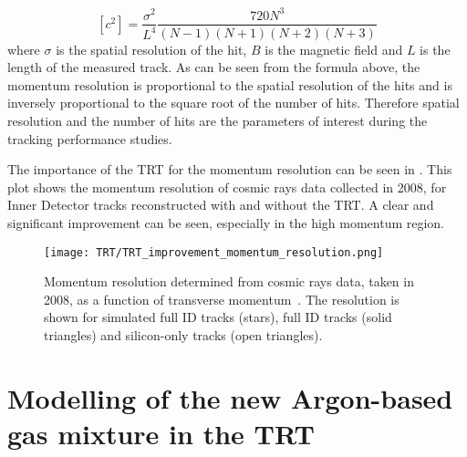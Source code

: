\begin{equation}
[c^2] = \dfrac{\sigma^2}{L^4}\dfrac{720 N^3}{(N-1)(N+1)(N+2)(N+3)}
\end{equation}
where $\sigma$ is the spatial resolution of the hit, $B$ is the magnetic field and $L$ is the length of the measured track.
As can be seen from the formula above, the momentum resolution is proportional to the spatial resolution of the hits and is inversely proportional to the square root of 
the number of hits. Therefore spatial resolution and the number of hits are the parameters of interest during the tracking performance studies.

The importance of the TRT for the momentum resolution can be seen in .
This plot shows the momentum resolution of cosmic rays data collected in 2008, for Inner Detector tracks reconstructed with and without the TRT.
A clear and significant improvement can be seen, especially in the high momentum region.


\begin{figure}[h]
\centering
\texttt{[image: TRT/TRT\_improvement\_momentum\_resolution.png]}
\caption{ 
Momentum resolution determined from cosmic rays data, taken in 2008, as a function of transverse momentum~\cite{Aad:2010bx}.
The resolution is shown for simulated full ID tracks (stars), full ID tracks (solid triangles) and silicon-only tracks (open triangles).
}
\label{fig:improvement_of_momentum_resolution}
\end{figure}



\section{Modelling of the new Argon-based gas mixture in the TRT}
\label{sec:digi_argon}

